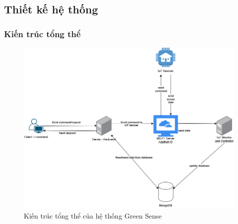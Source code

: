 \subsection{Thiết kế hệ thống}

\subsubsection{Kiến trúc tổng thể}
\begin{figure}[H]
    \centering
    \includegraphics[width=1\linewidth]{content/images/SystemComponents.png}
    \caption{Kiến trúc tổng thể của hệ thống Green Sense}
    \label{fig:overallStructure}
\end{figure}

